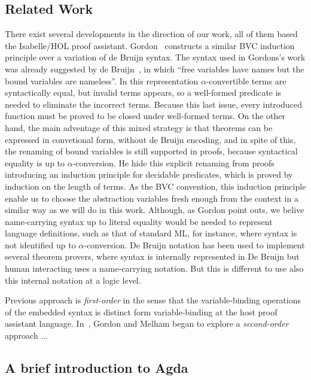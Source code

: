 \documentclass{entcs}
\newcommand{\alp}{\ensuremath{\alpha}}
\begin{document}
\subsection{Related Work}
\label{sec:relatedWork}

There exist several developments in the direction of our work, all of them based the Isabelle/HOL proof assistant. Gordon~\cite{gordon:mechanisation:1993} constructs a similar BVC induction principle over a variation of de Bruijn syntax. The syntax used in Gordons's work was already suggested by de Bruijn~\cite{deBruijn1972381}, in which ``free variables have names but the bound variables are nameless''. In this representation \alp-convertible terms are syntactically equal, but invalid terms appears, so a well-formed predicate is needed to eliminate the incorrect terms. Because this last issue, every introduced function must be proved to be closed under well-formed terms. On the other hand, the main adventage of this mixed strategy is that theorems can be expressed in convetional form, without de Bruijn encoding, and in spite of this, the renaming of bound variables is still supported in proofs, because syntactical equality is up to \alp-conversion. He hide this explicit renaming from proofs introducing an induction principle for decidable predicates, which is proved by induction on the length of terms. As the BVC convention, this induction principle enable us to choose the abstraction variables fresh enough from the context in a similar way as we will do in this work. Although, as Gordon point outs, we belive name-carrying syntax up to literal equality would be needed to represent language definitions, such as that of standard ML, for instance, where syntax is not identified up to \alp-conversion. De Bruijn notation has been used to implement several theorem provers, where syntax is internally represented in De Bruijn but human interacting uses a name-carrying notation. But this is different to use also this internal notation at a logic level. 

Previous approach is \emph{first-order} in the sense that the variable-binding operations of the embedded syntax is distinct form variable-binding at the host proof assistant language. In~\cite{DBLP:conf/tphol/GordonM96}, Gordon and Melham began to explore a \emph{second-order} approach ...





\subsection{A brief introduction to Agda}
\end{document}
